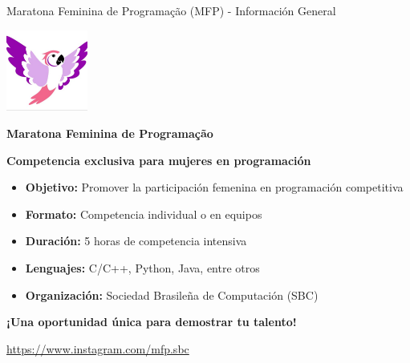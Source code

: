 \documentclass{beamer}
\begin{document}
\begin{frame}{Maratona Feminina de Programação (MFP) - Información General}
\begin{center}
\includegraphics[width=0.2\textwidth,keepaspectratio]{img/mfp_logo.jpeg}

\vspace{0.3cm}

\Large
\textbf{Maratona Feminina de Programação}

\vspace{0.2cm}

\normalsize
\textbf{Competencia exclusiva para mujeres en programación}

\vspace{0.3cm}

\begin{itemize}
\item \textbf{Objetivo:} Promover la participación femenina en programación competitiva
\item \textbf{Formato:} Competencia individual o en equipos
\item \textbf{Duración:} 5 horas de competencia intensiva
\item \textbf{Lenguajes:} C/C++, Python, Java, entre otros
\item \textbf{Organización:} Sociedad Brasileña de Computación (SBC)
\end{itemize}

\vspace{0.3cm}

\textbf{¡Una oportunidad única para demostrar tu talento!}

\vspace{0.2cm}

\small
\url{https://www.instagram.com/mfp.sbc}
\end{center}
\end{frame}
\end{document}
